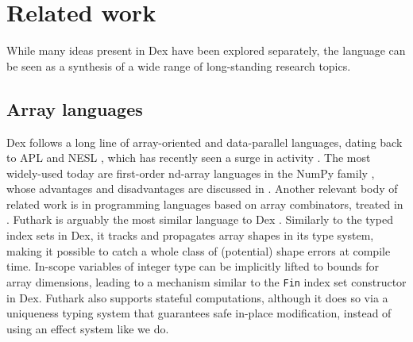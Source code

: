 \documentclass[acmsmall,screen,nonacm]{acmart}
\newcommand{\ExcessDetail}[1]{}
\begin{document}


\section{Related work}
\label{sec:related-work}

While many ideas present in Dex have been explored separately, the language can be seen as a synthesis of a wide range of long-standing research topics.

\subsection{Array languages}
\label{sec:related-array-languages}
Dex follows a long line of array-oriented and data-parallel languages, dating back to APL \cite{iverson1962apl} and NESL \cite{blelloch1993nesl}, which has recently seen a surge in activity \cite{peytonjones2008parallelhaskell,ragankelley2013halide,mcdonell2013optimizing,slepak2014remora,steuwer2017lift,shaikhha2019fsmooth,hu2019taichi}.
The most widely-used today are first-order nd-array languages in the NumPy family \cite{harris2020numpy,jax2018github,paszke2019pytorch,abadi2016tensorflow}, whose advantages and disadvantages are discussed in .
%
Another relevant body of related work is in programming languages based on array combinators, treated in .
%
Futhark is arguably the most similar language to Dex \cite{henriksen2017futhark}.
Similarly to the typed index sets in Dex, it tracks and propagates array shapes in its type system, making it possible to catch a whole class of (potential) shape errors at compile time.
In-scope variables of integer type can be implicitly lifted to bounds for array dimensions, leading to a mechanism similar to the \texttt{Fin} index set constructor in Dex.
Futhark also supports stateful computations, although it does so via a uniqueness typing system that guarantees safe in-place modification, instead of using an effect system like we do.
\ExcessDetail{
Finally, Futhark has been a huge inspiration for a large part of our compilation pipeline for accelerators.
}
\end{document}

